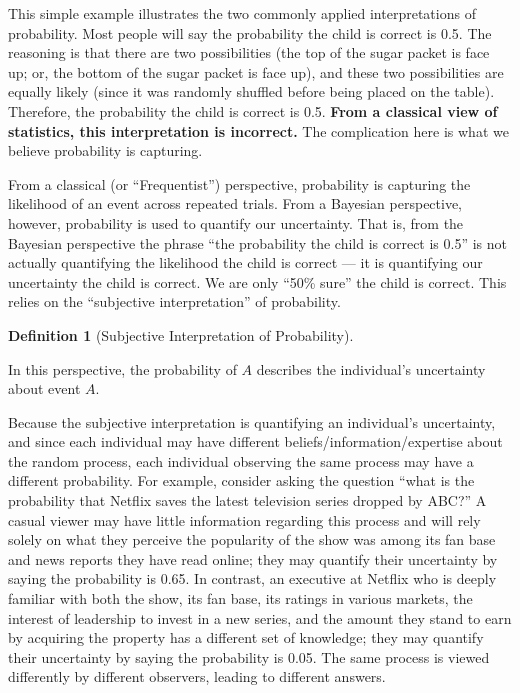 \documentclass[
  letterpaper,
  DIV=11,
  numbers=noendperiod]{scrreprt}
\theoremstyle{definition}
\newtheorem{definition}{Definition}[chapter]
\theoremstyle{plain}
\theoremstyle{definition}
\theoremstyle{remark}
\begin{document}
This simple example illustrates the two commonly applied interpretations
of probability. Most people will say the probability the child is
correct is 0.5. The reasoning is that there are two possibilities (the
top of the sugar packet is face up; or, the bottom of the sugar packet
is face up), and these two possibilities are equally likely (since it
was randomly shuffled before being placed on the table). Therefore, the
probability the child is correct is 0.5. \textbf{From a classical view
of statistics, this interpretation is incorrect.} The complication here
is what we believe probability is capturing.

From a classical (or ``Frequentist'') perspective, probability is
capturing the likelihood of an event across repeated trials. From a
Bayesian perspective, however, probability is used to quantify our
uncertainty. That is, from the Bayesian perspective the phrase ``the
probability the child is correct is 0.5'' is not actually quantifying
the likelihood the child is correct --- it is quantifying our
uncertainty the child is correct. We are only ``50\% sure'' the child is
correct. This relies on the ``subjective interpretation'' of
probability.

\begin{definition}[Subjective Interpretation of
Probability]\protect\hypertarget{def-subjective-interpretation}{}\label{def-subjective-interpretation}

In this perspective, the probability of \(A\) describes the individual's
uncertainty about event \(A\).

\end{definition}

Because the subjective interpretation is quantifying an individual's
uncertainty, and since each individual may have different
beliefs/information/expertise about the random process, each individual
observing the same process may have a different probability. For
example, consider asking the question ``what is the probability that
Netflix saves the latest television series dropped by ABC?'' A casual
viewer may have little information regarding this process and will rely
solely on what they perceive the popularity of the show was among its
fan base and news reports they have read online; they may quantify their
uncertainty by saying the probability is 0.65. In contrast, an executive
at Netflix who is deeply familiar with both the show, its fan base, its
ratings in various markets, the interest of leadership to invest in a
new series, and the amount they stand to earn by acquiring the property
has a different set of knowledge; they may quantify their uncertainty by
saying the probability is 0.05. The same process is viewed differently
by different observers, leading to different answers.
\end{document}
